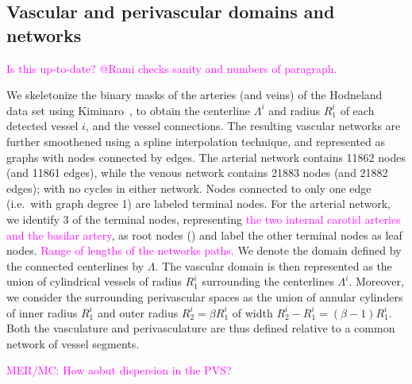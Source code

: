 \documentclass[fleqn,10pt]{wlscirep}
\newcommand{\mer}[1]{\textcolor{magenta}{#1}}
\begin{document}
\subsection*{Vascular and perivascular domains and networks}

\mer{Is this up-to-date? @Rami checks sanity and numbers of paragraph.}

We skeletonize the binary masks of the arteries (and veins) of the
Hodneland~\cite{hodneland2019new} data set using
Kiminaro~\cite{william_silversmith_2021_5539913}, to obtain the
centerline $\Lambda^i$ and radius $R_1^i$ of each detected vessel $i$,
and the vessel connections. The resulting vascular networks are
further smoothened using a spline interpolation technique, and
represented as graphs with nodes connected by edges. The arterial
network contains 11862 nodes (and 11861 edges), while the venous
network contains 21883 nodes (and 21882 edges); with no cycles in
either network. Nodes connected to only one edge (i.e.~with graph
degree 1) are labeled terminal nodes. For the arterial network, we
identify 3 of the terminal nodes, representing \mer{the two internal
  carotid arteries and the basilar artery}, as root nodes
() and label the other terminal nodes as leaf
nodes. \mer{Range of lengths of the networks paths.} We denote the
domain defined by the connected centerlines by $\Lambda$. The vascular
domain is then represented as the union of cylindrical vessels of
radius $R_1^i$ surrounding the centerlines $\Lambda^i$. Moreover, we
consider the surrounding perivascular spaces as the union of annular
cylinders of inner radius $R_1^i$ and outer radius $R_2^i = \beta R_1^i$ of width $R_2^i - R_1^i = (\beta - 1) R_1^i$. Both the vasculature and perivasculature are thus defined relative to a common network of vessel segments.

\mer{MER/MC: How aobut dispersion in the PVS?}
\end{document}
